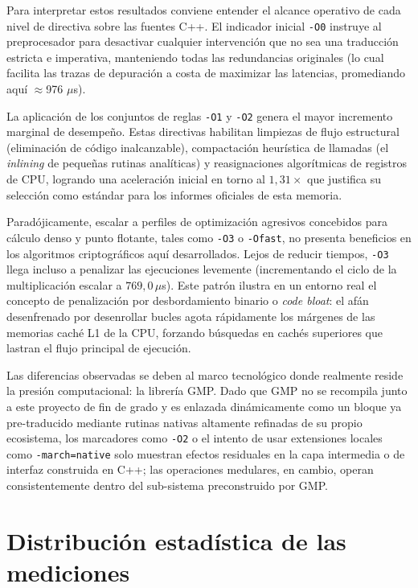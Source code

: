Para interpretar estos resultados conviene entender el alcance operativo de cada nivel de directiva sobre las fuentes C++. El indicador inicial \texttt{-O0} instruye al preprocesador 
para desactivar cualquier intervención que no sea una traducción estricta e imperativa, manteniendo todas las redundancias originales (lo cual facilita las trazas de 
depuración a costa de maximizar las latencias, promediando aquí $\approx$976 $\mu$s). 

La aplicación de los conjuntos de reglas \texttt{-O1} y \texttt{-O2} genera el mayor incremento marginal de desempeño. Estas directivas habilitan limpiezas de flujo estructural 
(eliminación de código inalcanzable), compactación heurística de llamadas (el \textit{inlining} de pequeñas rutinas analíticas) y reasignaciones algorítmicas de registros de CPU, 
logrando una aceleración inicial en torno al $1{,}31\times$ que justifica su selección como estándar para los informes oficiales de esta memoria.

Paradójicamente, escalar a perfiles de optimización agresivos concebidos para cálculo denso y punto flotante, tales como \texttt{-O3} o \texttt{-Ofast}, no presenta beneficios en los 
algoritmos criptográficos aquí desarrollados. Lejos de reducir tiempos, \texttt{-O3} llega incluso a penalizar las ejecuciones levemente (incrementando el ciclo de la multiplicación 
escalar a $769{,}0\,\mu$s). Este patrón ilustra en un entorno real el concepto de penalización por desbordamiento binario o \textit{code bloat}: el afán desenfrenado por 
desenrollar bucles agota rápidamente los márgenes de las memorias caché L1 de la CPU, forzando búsquedas en cachés superiores que lastran el flujo principal de ejecución. 

Las diferencias observadas se deben al marco tecnológico donde realmente reside la presión computacional: la librería GMP. 
Dado que GMP no se recompila junto a este proyecto de fin de grado y es enlazada dinámicamente como un bloque ya pre-traducido mediante rutinas nativas altamente refinadas de su propio 
ecosistema, los marcadores como \texttt{-O2} o el intento de usar extensiones locales como \texttt{-march=native} solo muestran efectos residuales en la capa intermedia o de interfaz construida 
en C++; las operaciones medulares, en cambio, operan consistentemente dentro del sub-sistema preconstruido por GMP. 

\section{Distribución estadística de las mediciones}
\label{sec:res-distribucion}

